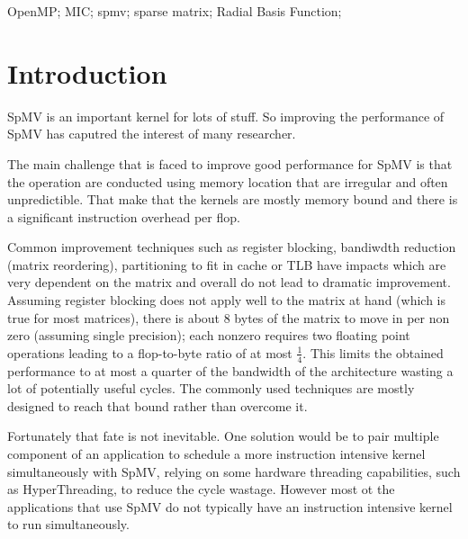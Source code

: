 \documentclass[10pt,conference,compsocconf]{IEEEtran}
\begin{document}
\begin{IEEEkeywords}
OpenMP; MIC; spmv; sparse matrix; Radial Basis Function;
\end{IEEEkeywords}

\IEEEpeerreviewmaketitle

\section{Introduction}
\cite{Bell08, Vuduc05, Nishtala07, Stock12-TACC, Cuthill69, cramer2012openmp, Buluc2009_SPAA, Buluc11, Im01, Mellor-Crummey04, Nishtala07, Saad94sparskit, Williams07}
\cite{Temam:1992:CBS:147877.148091}
\cite{DBLP:journals/ijhpca/ShantharamCR11,
conf/ppsc/Toledo97, Liu:2013:ESM:2464996.2465013, Molka:2009:MPC:1636712.1637764,%
DBLP:journals/corr/abs-1101-0091, conf/ipps/BulucWOD11, conf/ipps/KreutzerHWFBB12,%
kumar2012accelerating, journals/concurrency/VazquezFG11}

SpMV is an important kernel for lots of stuff. So improving the
performance of SpMV has caputred the interest of many researcher.

The main challenge that is faced to improve good performance for SpMV
is that the operation are conducted using memory location that are
irregular and often unpredictible. That make that the kernels are
mostly memory bound and there is a significant instruction overhead
per flop.

Common improvement techniques such as register blocking, bandiwdth
reduction (matrix reordering), partitioning to fit in cache or TLB
have impacts which are very dependent on the matrix and overall do not
lead to dramatic improvement. Assuming register blocking does not
apply well to the matrix at hand (which is true for most matrices),
there is about 8 bytes of the matrix to move in per non zero (assuming
single precision); each nonzero requires two floating point operations
leading to a flop-to-byte ratio of at most $\frac{1}{4}$. This limits
the obtained performance to at most a quarter of the bandwidth of the
architecture wasting a lot of potentially useful cycles. The commonly
used techniques are mostly designed to reach that bound rather than
overcome it.

Fortunately that fate is not inevitable. One solution would be to pair
multiple component of an application to schedule a more instruction
intensive kernel simultaneously with SpMV, relying on some hardware
threading capabilities, such as HyperThreading, to reduce the cycle
wastage. However most ot the applications that use SpMV do not
typically have an instruction intensive kernel to run simultaneously.
\end{document}

